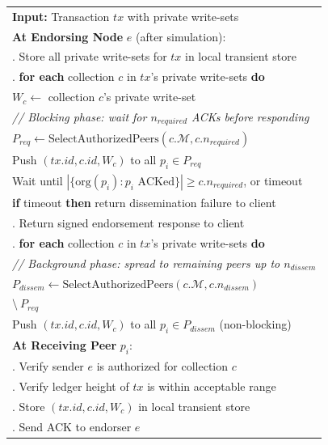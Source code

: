 \begin{algorithm}[h]
\centering
\small
\begin{tabular}{|p{}|}
\hline
\textbf{Input:} Transaction $tx$ with private write-sets \\[3pt]
\textbf{At Endorsing Node} $e$ (after simulation): \\
\quad 1. Store all private write-sets for $tx$ in local transient store \\
\quad 2. \textbf{for each} collection $c$ in $tx$'s private write-sets \textbf{do} \\
\quad\quad\quad $W_c \leftarrow$ collection $c$'s private write-set \\
\quad\quad\quad \textit{// Blocking phase: wait for $n_{required}$ ACKs before responding} \\
\quad\quad\quad $P_{req} \leftarrow \text{SelectAuthorizedPeers}(c.\mathcal{M}, c.n_{required})$ \\
\quad\quad\quad Push $(tx.id, c.id, W_c)$ to all $p_i \in P_{req}$ \\
\quad\quad\quad Wait until $|\{\text{org}(p_i) : p_i \text{ ACKed}\}| \geq c.n_{required}$, or timeout \\
\quad\quad\quad \textbf{if} timeout \textbf{then} return dissemination failure to client \\
\quad 3. Return signed endorsement response to client \\
\quad 4. \textbf{for each} collection $c$ in $tx$'s private write-sets \textbf{do} \\
\quad\quad\quad \textit{// Background phase: spread to remaining peers up to $n_{dissem}$} \\
\quad\quad\quad $P_{dissem} \leftarrow \text{SelectAuthorizedPeers}(c.\mathcal{M}, c.n_{dissem})$ \\
\quad\quad\quad\quad\quad $\setminus\ P_{req}$ \\
\quad\quad\quad Push $(tx.id, c.id, W_c)$ to all $p_i \in P_{dissem}$ (non-blocking) \\[3pt]
\textbf{At Receiving Peer} $p_i$: \\
\quad 1. Verify sender $e$ is authorized for collection $c$ \\
\quad 2. Verify ledger height of $tx$ is within acceptable range \\
\quad 3. Store $(tx.id, c.id, W_c)$ in local transient store \\
\quad 4. Send ACK to endorser $e$ \\
\hline
\end{tabular}
\caption{Proactive dissemination protocol.}
\label{alg:dissemination}
\end{algorithm}

